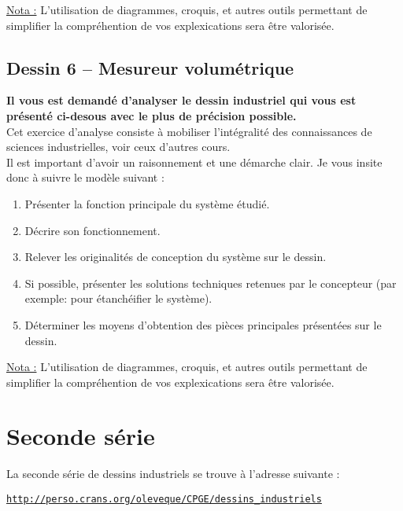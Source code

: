 \underline{Nota :} L'utilisation de diagrammes, croquis, et autres outils permettant de simplifier la compréhention de vos explexications sera être valorisée.



\subsection{Dessin 6 -- Mesureur volumétrique}
\textbf{Il vous est demandé d'analyser le dessin industriel qui vous est présenté ci-desous avec le plus de précision possible.}\\
Cet exercice d'analyse consiste à mobiliser l'intégralité des connaissances de sciences industrielles, voir ceux d'autres cours.\\
Il est important d'avoir un raisonnement et une démarche clair. Je vous insite donc à suivre le modèle suivant :

\begin{enumerate}
\item Présenter la fonction principale du système étudié.
\item Décrire son fonctionnement.
\item Relever les originalités de conception du système sur le dessin.
\item Si possible, présenter les solutions techniques retenues par le concepteur (par exemple: pour étanchéifier le système).
\item Déterminer les moyens d'obtention des pièces principales présentées sur le dessin.
\end{enumerate}

\underline{Nota :} L'utilisation de diagrammes, croquis, et autres outils permettant de simplifier la compréhention de vos explexications sera être valorisée.




\section{Seconde série}

La seconde série de dessins industriels se trouve à l'adresse suivante :

\vspace*{\baselineskip}
\begin{center}
\texttt{\url{http://perso.crans.org/oleveque/CPGE/dessins_industriels}}
\end{center}

